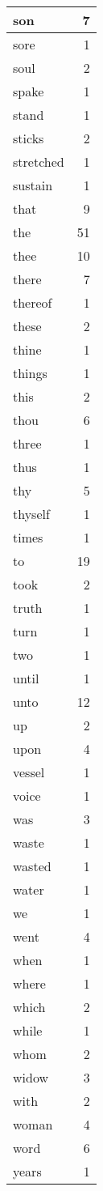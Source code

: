 \begin{center}
\begin{longtable}{l|r}
son & 7\\ \hline 
sore & 1\\ \hline 
soul & 2\\ \hline 
spake & 1\\ \hline 
stand & 1\\ \hline 
sticks & 2\\ \hline 
stretched & 1\\ \hline 
sustain & 1\\ \hline 
that & 9\\ \hline 
the & 51\\ \hline 
thee & 10\\ \hline 
there & 7\\ \hline 
thereof & 1\\ \hline 
these & 2\\ \hline 
thine & 1\\ \hline 
things & 1\\ \hline 
this & 2\\ \hline 
thou & 6\\ \hline 
three & 1\\ \hline 
thus & 1\\ \hline 
thy & 5\\ \hline 
thyself & 1\\ \hline 
times & 1\\ \hline 
to & 19\\ \hline 
took & 2\\ \hline 
truth & 1\\ \hline 
turn & 1\\ \hline 
two & 1\\ \hline 
until & 1\\ \hline 
unto & 12\\ \hline 
up & 2\\ \hline 
upon & 4\\ \hline 
vessel & 1\\ \hline 
voice & 1\\ \hline 
was & 3\\ \hline 
waste & 1\\ \hline 
wasted & 1\\ \hline 
water & 1\\ \hline 
we & 1\\ \hline 
went & 4\\ \hline 
when & 1\\ \hline 
where & 1\\ \hline 
which & 2\\ \hline 
while & 1\\ \hline 
whom & 2\\ \hline 
widow & 3\\ \hline 
with & 2\\ \hline 
woman & 4\\ \hline 
word & 6\\ \hline 
years & 1\\ \hline 
\end{longtable}
\end{center}



